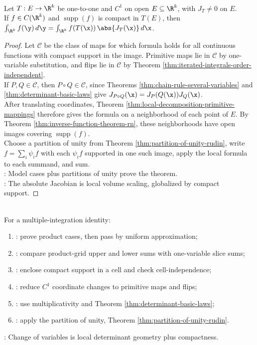 \begin{theorem} \label{thm:change-of-variables-rk}\label{thm:multiple-integration-main-source-todo} \\
Let $T:E\to\R^k$ be one-to-one and $C^1$ on open $E\subseteq\R^k$, with $J_T\neq0$ on $E$.\\
If $f\in C(\R^k)$ and $\operatorname{supp}(f)$ is compact in $T(E)$, then $\int_{\R^k}f(\y)\,d\y = \int_{\R^k}f(T(\x))\,\abs{J_T(\x)}\,d\x$.
\begin{proof}
Let $\mathcal{C}$ be the class of maps for which formula holds for all continuous functions with compact support in the image. Primitive maps lie in $\mathcal{C}$ by one-variable substitution, and flips lie in $\mathcal{C}$ by Theorem \ref{thm:iterated-integrals-order-independent}.\\
If $P,Q\in\mathcal{C}$, then $P\circ Q\in\mathcal{C}$, since Theorems \ref{thm:chain-rule-several-variables} and \ref{thm:determinant-basic-laws} give $J_{P\circ Q}(\x)=J_P(Q(\x))J_Q(\x)$.\\
After translating coordinates, Theorem \ref{thm:local-decomposition-primitive-mappings} therefore gives the formula on a neighborhood of each point of $E$. By Theorem \ref{thm:inverse-function-theorem-rn}, these neighborhoods have open images covering $\operatorname{supp}(f)$.\\
Choose a partition of unity from Theorem \ref{thm:partition-of-unity-rudin}, write $f=\sum_i\psi_i f$ with each $\psi_i f$ supported in one such image, apply the local formula to each summand, and sum.\\
: Model cases plus partitions of unity prove the theorem.\\
: The absolute Jacobian is local volume scaling, globalized by compact support.
\end{proof}
\end{theorem}

\begin{method} \label{meth:multiple-integration-proof-patterns-source-todo}\label{meth:multiple-integration-proof-patterns} \\
For a multiple-integration identity:
\begin{enumerate}[label=(\roman*)]
\setlength{\itemsep}{0pt}
\item {}: prove product cases, then pass by uniform approximation;
\item {}: compare product-grid upper and lower sums with one-variable slice sums;
\item {}: enclose compact support in a cell and check cell-independence;
\item {}: reduce $C^1$ coordinate changes to primitive maps and flips;
\item {}: use multiplicativity and Theorem \ref{thm:determinant-basic-laws};
\item {}: apply the partition of unity, Theorem \ref{thm:partition-of-unity-rudin}.
\end{enumerate}
: Change of variables is local determinant geometry plus compactness.
\end{method}
